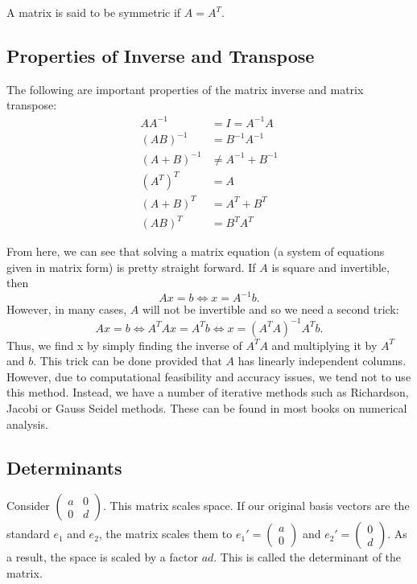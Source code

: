 \documentclass[
]{book}
\theoremstyle{definition}
\theoremstyle{definition}
\theoremstyle{definition}
\theoremstyle{definition}
\theoremstyle{remark}
\begin{document}
A matrix is said to be symmetric if \(A = A^T\).

\hypertarget{properties-of-inverse-and-transpose}{%
\subsection{Properties of Inverse and Transpose}\label{properties-of-inverse-and-transpose}}

The following are important properties of the matrix inverse and matrix transpose:
\begin{align*} 
AA^{-1} &= I = A^{-1}A\\
(AB)^{-1} &= B^{-1}A^{-1}\\
(A + B)^{-1} &\not = A^{-1} + B^{-1}\\
(A^T)^T &=A\\
(A+B)^T &= A^T + B^T\\
(AB)^T &= B^TA^T
\end{align*}

From here, we can see that solving a matrix equation (a system of equations given in matrix form) is pretty straight forward. If \(A\) is square and invertible, then \[Ax = b \Leftrightarrow x = A^{-1}b.\] However, in many cases, \(A\) will not be invertible and so we need a second trick:
\[Ax = b \Leftrightarrow A^TAx = A^Tb \Leftrightarrow x = (A^TA)^{-1}A^Tb.\] Thus, we find x by simply finding the inverse of \(A^TA\) and multiplying it by \(A^T\) and \(b\). This trick can be done provided that \(A\) has linearly independent columns. However, due to computational feasibility and accuracy issues, we tend not to use this method. Instead, we have a number of iterative methods such as Richardson, Jacobi or Gauss Seidel methods. These can be found in most books on numerical analysis.

\hypertarget{determinants}{%
\subsection{Determinants}\label{determinants}}

Consider \(\begin{pmatrix} a & 0 \\ 0 & d \end{pmatrix}\). This matrix scales space. If our original basis vectors are the standard \(e_1\) and \(e_2\), the matrix scales them to \(e_1' = \begin{pmatrix}a \\ 0 \end{pmatrix}\) and \(e_2'=\begin{pmatrix} 0 \\ d \end{pmatrix}\). As a result, the space is scaled by a factor \(ad\). This is called the determinant of the matrix.
\end{document}
